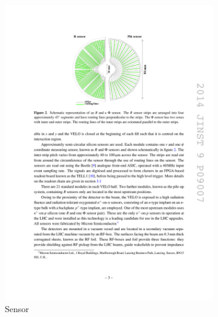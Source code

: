 \begin{figure}[!h]
    \centering
    \begin{subfigure}[t]{0.4\textwidth}
        \centering        
        \includegraphics[width=1.0\textwidth]{figs/Detector/velo_r_phi_sensor.pdf}
        \caption{Sensor}
    \end{subfigure}
    \begin{subfigure}[t]{0.8\textwidth}
        \centering

\end{subfigure}
\end{figure}
